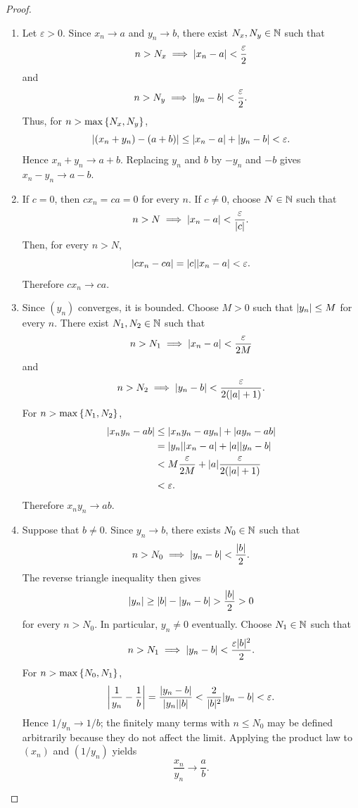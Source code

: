 \documentclass[11pt,a4paper]{amsart}
\begin{document}
\begin{proof}
  \begin{enumerate}
    \item
      Let \(\varepsilon>0\). Since \(x_n\to a\) and \(y_n\to b\), there exist
      \(N_x,N_y\in\NN\) such that
      \[
        n>N_x\implies\abs{x_n-a}<\frac{\varepsilon}{2}
      \]
      and
      \[
        n>N_y\implies\abs{y_n-b}<\frac{\varepsilon}{2}.
      \]
      Thus, for \(n>\maxset{N_x,N_y}\),
      \[
        \abs{(x_n+y_n)-(a+b)}
        \leq\abs{x_n-a}+\abs{y_n-b}
        <\varepsilon.
      \]
      Hence \(x_n+y_n\to a+b\). Replacing \(y_n\) and \(b\) by \(-y_n\)
      and \(-b\) gives \(x_n-y_n\to a-b\).

    \item
      If \(c=0\), then \(cx_n=ca=0\) for every \(n\). If \(c\neq0\), choose
      \(N\in\NN\) such that
      \[
        n>N\implies\abs{x_n-a}<\frac{\varepsilon}{\abs{c}}.
      \]
      Then, for every \(n>N\),
      \[
        \abs{cx_n-ca}=\abs{c}\abs{x_n-a}<\varepsilon.
      \]
      Therefore \(cx_n\to ca\).

    \item
      Since \((y_n)\) converges, it is bounded. Choose \(M>0\) such that
      \(\abs{y_n}\leq M\) for every \(n\). There exist \(N_1,N_2\in\NN\)
      such that
      \[
        n>N_1\implies\abs{x_n-a}<\frac{\varepsilon}{2M}
      \]
      and
      \[
        n>N_2\implies\abs{y_n-b}<\frac{\varepsilon}{2(\abs{a}+1)}.
      \]
      For \(n>\maxset{N_1,N_2}\),
      \begin{align*}
        \abs{x_ny_n-ab}
        &\leq\abs{x_ny_n-ay_n}+\abs{ay_n-ab} \\
        &=\abs{y_n}\abs{x_n-a}+\abs{a}\abs{y_n-b} \\
        &<M\frac{\varepsilon}{2M}
        +\abs{a}\frac{\varepsilon}{2(\abs{a}+1)} \\
        &<\varepsilon.
      \end{align*}
      Therefore \(x_ny_n\to ab\).

    \item
      Suppose that \(b\neq0\). Since \(y_n\to b\), there exists
      \(N_0\in\NN\) such that
      \[
        n>N_0\implies\abs{y_n-b}<\frac{\abs{b}}{2}.
      \]
      The reverse triangle inequality then gives
      \[
        \abs{y_n}\geq\abs{b}-\abs{y_n-b}>\frac{\abs{b}}{2}>0
      \]
      for every \(n>N_0\). In particular, \(y_n\neq0\) eventually. Choose
      \(N_1\in\NN\) such that
      \[
        n>N_1\implies
        \abs{y_n-b}<\frac{\varepsilon\abs{b}^2}{2}.
      \]
      For \(n>\maxset{N_0,N_1}\),
      \[
        \abs*{\frac{1}{y_n}-\frac{1}{b}}
        =\frac{\abs{y_n-b}}{\abs{y_n}\abs{b}}
        <\frac{2}{\abs{b}^2}\abs{y_n-b}
        <\varepsilon.
      \]
      Hence \(1/y_n\to1/b\); the finitely many terms with \(n\leq N_0\) may be
      defined arbitrarily because they do not affect the limit. Applying the
      product law to \((x_n)\) and \((1/y_n)\) yields
      \[
        \frac{x_n}{y_n}\to\frac{a}{b}.
      \]
  \end{enumerate}
\end{proof}
\end{document}
